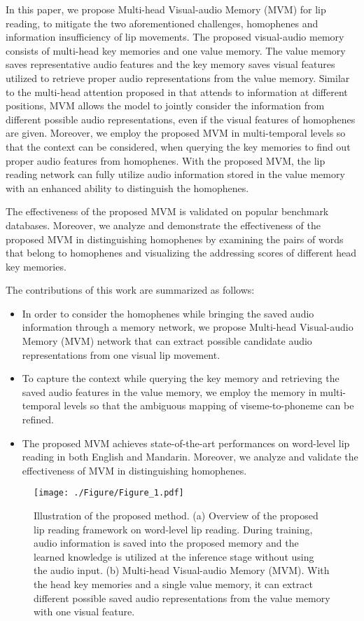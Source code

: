 \documentclass[letterpaper]{article} \usepackage{aaai22}  \usepackage{times}  \usepackage{helvet}  \usepackage{courier}  \usepackage[hyphens]{url}  \usepackage{graphicx} \urlstyle{rm} \def\UrlFont{\rm}  \usepackage{natbib}  \usepackage{caption} \DeclareCaptionStyle{ruled}{labelfont=normalfont,labelsep=colon,strut=off} \frenchspacing  \setlength{\pdfpagewidth}{8.5in}  \setlength{\pdfpageheight}{11in}  \usepackage{algorithm}
\begin{document}
In this paper, we propose Multi-head Visual-audio Memory (MVM) for lip reading, to mitigate the two aforementioned challenges, homophenes and information insufficiency of lip movements. The proposed visual-audio memory consists of multi-head key memories and one value memory. The value memory saves representative audio features and the key memory saves visual features utilized to retrieve proper audio representations from the value memory. Similar to the multi-head attention proposed in \cite{vaswani2017attention} that attends to information at different positions, MVM allows the model to jointly consider the information from different possible audio representations, even if the visual features of homophenes are given. Moreover, we employ the proposed MVM in multi-temporal levels so that the context can be considered, when querying the key memories to find out proper audio features from homophenes. With the proposed MVM, the lip reading network can fully utilize audio information stored in the value memory with an enhanced ability to distinguish the homophenes. 

The effectiveness of the proposed MVM is validated on popular benchmark databases. Moreover, we analyze and demonstrate the effectiveness of the proposed MVM in distinguishing homophenes by examining the pairs of words that belong to homophenes and visualizing the addressing scores of different head key memories. 

The contributions of this work are summarized as follows:
\begin{itemize}
    \item In order to consider the homophenes while bringing the saved audio information through a memory network, we propose Multi-head Visual-audio Memory (MVM) network that can extract possible candidate audio representations from one visual lip movement.
    \item To capture the context while querying the key memory and retrieving the saved audio features in the value memory, we employ the memory in multi-temporal levels so that the ambiguous mapping of viseme-to-phoneme can be refined.
    \item The proposed MVM achieves state-of-the-art performances on word-level lip reading in both English and Mandarin. Moreover, we analyze and validate the effectiveness of MVM in distinguishing homophenes.
\end{itemize}

\begin{figure*}[t!]
	\begin{minipage}[b]{1.0\linewidth}
		\centering
		\centerline{\texttt{[image: ./Figure/Figure\_1.pdf]}}
	\end{minipage}
	\caption{Illustration of the proposed method. (a) Overview of the proposed lip reading framework on word-level lip reading. During training, audio information is saved into the proposed memory and the learned knowledge is utilized at the inference stage without using the audio input. (b) Multi-head Visual-audio Memory (MVM). With the  head key memories and a single value memory, it can extract different possible saved audio representations from the value memory with one visual feature.}
	\label{fig:1}
\end{figure*}
\end{document}
